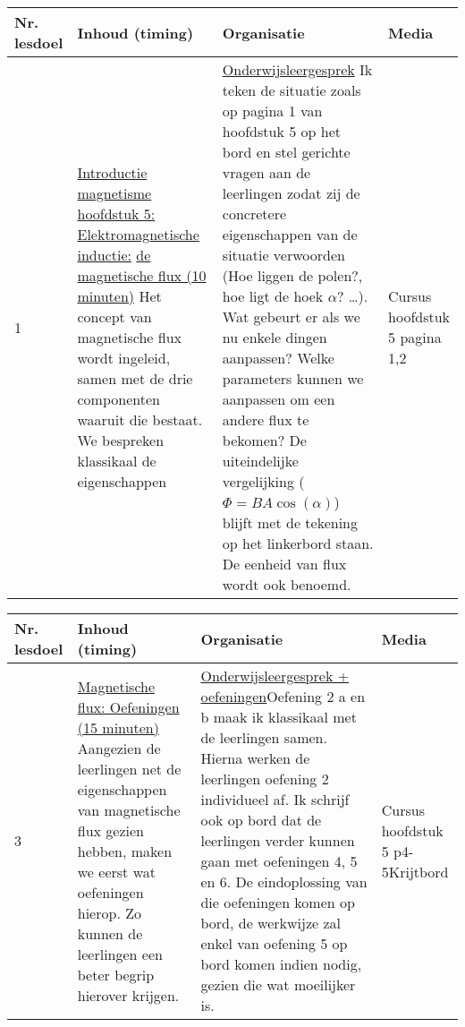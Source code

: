 \begin{landscape}
\newpage
	

\begin{tabularx}{1.56\textwidth}{|p{1.5cm}|p{9cm}|X|p{4cm}|}
	\hline
	\textbf{Nr. lesdoel } & \textbf{Inhoud (timing)}  & \textbf{Organisatie } & \textbf{Media } \\ \hline
	 1\newline\newline 2&\underline{Introductie magnetisme hoofdstuk 5:  } \underline{ Elektromagnetische inductie:} \underline{de magnetische flux (10 minuten)}\newline
	Het concept van magnetische flux wordt ingeleid, samen met de drie componenten waaruit die bestaat. We bespreken klassikaal de eigenschappen
	&  \underline{Onderwijsleergesprek}\newline 
	Ik teken de situatie zoals op pagina 1 van hoofdstuk 5 op het bord en stel gerichte vragen aan de leerlingen zodat zij de concretere eigenschappen van de situatie verwoorden (Hoe liggen de polen?, hoe ligt de hoek $\alpha$? \ldots). Wat gebeurt er als we nu enkele dingen aanpassen? Welke parameters kunnen we aanpassen om een andere flux te bekomen?	De uiteindelijke vergelijking ($\Phi = BA\cos(\alpha)$) blijft met de tekening op het linkerbord staan. De eenheid van flux wordt ook benoemd.
	&  Cursus hoofdstuk 5 pagina 1,2
	\\ \hline
\end{tabularx}

\begin{tabularx}{1.56\textwidth}{|p{1.5cm}|p{8cm}|X|p{3cm}|}
	\hline
	\textbf{Nr. lesdoel } & \textbf{Inhoud (timing)}  & \textbf{Organisatie } & \textbf{Media } \\ \hline
	3& \underline{Magnetische flux: Oefeningen (15 minuten)}\newline
	Aangezien de leerlingen net de eigenschappen van magnetische flux gezien hebben, maken we eerst wat oefeningen hierop. Zo kunnen de leerlingen een beter begrip hierover krijgen.
	&  \underline{Onderwijsleergesprek + oefeningen}\newline  Oefening 2 a en b maak ik klassikaal met de leerlingen samen. Hierna werken de leerlingen oefening 2 individueel af. Ik schrijf ook op bord dat de leerlingen verder kunnen gaan met oefeningen 4, 5 en 6. De eindoplossing van die oefeningen komen op bord, de werkwijze zal enkel van oefening 5 op bord komen indien nodig, gezien die wat moeilijker is.
	&  Cursus hoofdstuk 5 p4-5\newline\newline Krijtbord
	\\ \hline
\end{tabularx}\vspace{5mm}



\end{landscape}
